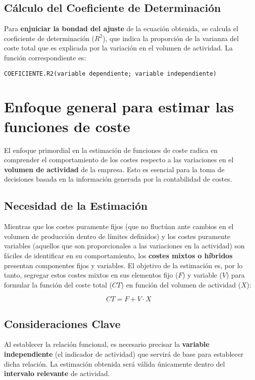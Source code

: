 \subsection{Cálculo del Coeficiente de Determinación}
Para \textbf{enjuiciar la bondad del ajuste} de la ecuación obtenida, se calcula el coeficiente de determinación ($R^2$), que indica la proporción de la varianza del coste total que es explicada por la variación en el volumen de actividad. La función correspondiente es:
\begin{lstlisting}[style=elegant, basicstyle=\ttfamily\small]
COEFICIENTE.R2(variable dependiente; variable independiente)
\end{lstlisting}

\section{Enfoque general para estimar las funciones de coste}

El enfoque primordial en la estimación de funciones de coste radica en comprender el comportamiento de los costes respecto a las variaciones en el \textbf{volumen de actividad} de la empresa. Esto es esencial para la toma de decisiones basada en la información generada por la contabilidad de costes.

\subsection{Necesidad de la Estimación}
Mientras que los costes puramente fijos (que no fluctúan ante cambios en el volumen de producción dentro de límites definidos) y los costes puramente variables (aquellos que son proporcionales a las variaciones en la actividad) son fáciles de identificar en su comportamiento, los \textbf{costes mixtos o híbridos} presentan componentes fijos y variables. El objetivo de la estimación es, por lo tanto, segregar estos costes mixtos en sus elementos fijo ($F$) y variable ($V$) para formular la función del coste total ($CT$) en función del volumen de actividad ($X$):

$$CT = F + V \cdot X$$

\subsection{Consideraciones Clave}
Al establecer la relación funcional, es necesario precisar la \textbf{variable independiente} (el indicador de actividad) que servirá de base para establecer dicha relación. La estimación obtenida será válida únicamente dentro del \textbf{intervalo relevante} de actividad.

